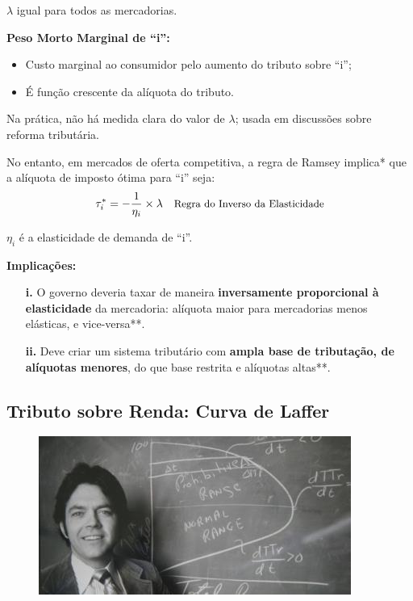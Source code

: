 \documentclass[a4paper,12pt]{article}[abntex2]
\begin{document}
$\lambda$ igual para todos as mercadorias.

\textbf{Peso Morto Marginal de ``i'':}
\begin{itemize}
  \item Custo marginal ao consumidor pelo aumento do tributo sobre ``i'';
  \item É função crescente da alíquota do tributo.
\end{itemize}

Na prática, não há medida clara do valor de $\lambda$; usada em discussões sobre reforma tributária.

No entanto, em mercados de oferta competitiva, a regra de Ramsey implica* que a alíquota de imposto ótima para ``i'' seja:
\[
\tau_i^* = -\frac{1}{\eta_i} \times \lambda \quad \text{\small {Regra do Inverso da Elasticidade}}
\]

$\eta_i$ é a elasticidade de demanda de ``i''.

\textbf{Implicações:}
\begin{enumerate}
  \item[\textbf{i.}] O governo deveria taxar de maneira \textbf{inversamente proporcional à elasticidade} da mercadoria: alíquota maior para mercadorias menos elásticas, e vice-versa**.
  \item[\textbf{ii.}] Deve criar um sistema tributário com \textbf{ampla base de tributação, de alíquotas menores}, do que base restrita e alíquotas altas**.
\end{enumerate}

\subsection{\textbf{Tributo sobre Renda: Curva de Laffer}}
\begin{figure}
    \centering
    \includegraphics[width=0.75\linewidth]{Imagens/a18i12.png}
\end{figure}
\end{document}
